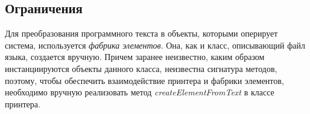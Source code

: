 \subsection{Ограничения}
Для преобразования программного текста в объекты, которыми оперирует система, используется \emph{фабрика элементов}.
Она, как и класс, описывающий файл языка, создается вручную.
Причем заранее неизвестно, каким образом инстанциируются объекты данного класса, неизвестна сигнатура методов, поэтому, чтобы обеспечить взаимодействие принтера и фабрики элементов, необходимо вручную реализовать метод \emph{createElementFromText} в классе принтера.